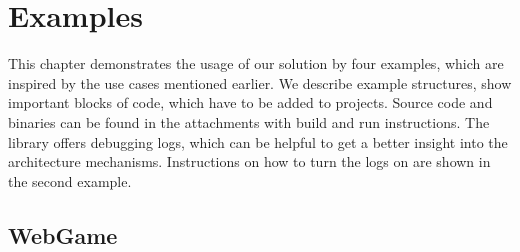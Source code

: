 \chapter{Examples}

This chapter demonstrates the usage of our solution by four examples, which are inspired by the use cases mentioned earlier.
We describe example structures, show important blocks of code, which have to be added to projects.
Source code and binaries can be found in the attachments with build and run instructions.
The library offers debugging logs, which can be helpful to get a better insight into the architecture mechanisms.
Instructions on how to turn the logs on are shown in the second example.

\section{WebGame}

